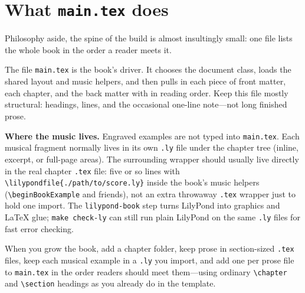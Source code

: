 \section{What \texttt{main.tex} does}

Philosophy aside, the spine of the build is almost insultingly small: one file lists the whole book in the order a reader meets it.

The file \verb|main.tex| is the book's driver. It chooses the document class, loads the shared layout and music helpers, and then pulls in each piece of front matter, each chapter, and the back matter with \verb|| in reading order. Keep this file mostly structural: headings, \verb|| lines, and the occasional one-line note—not long finished prose.

\textbf{Where the music lives.} Engraved examples are not typed into \verb|main.tex|. Each musical fragment normally lives in its own \verb|.ly| file under the chapter tree (inline, excerpt, or full-page areas). The surrounding wrapper should usually live directly in the real chapter \verb|.tex| file: five or so lines with \verb|\lilypondfile{./path/to/score.ly}| inside the book's music helpers (\verb|\beginBookExample| and friends), not an extra throwaway \verb|.tex| wrapper just to hold one import. The \verb|lilypond-book| step turns LilyPond into graphics and LaTeX glue; \verb|make check-ly| can still run plain LilyPond on the same \verb|.ly| files for fast error checking.

When you grow the book, add a chapter folder, keep prose in section-sized \verb|.tex| files, keep each musical example in a \verb|.ly| you import, and add one \verb|| per prose file to \verb|main.tex| in the order readers should meet them—using ordinary \verb|\chapter| and \verb|\section| headings as you already do in the template.
